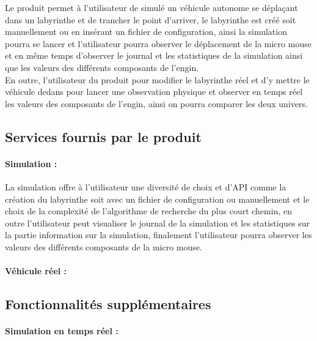 \vspace{5mm}
Le produit permet à l'utilisateur de simulé un véhicule autonome se 
déplaçant dans un labyrinthe et de trancher le point d'arriver, le 
labyrinthe est créé soit manuellement ou en insérant un fichier de 
configuration, ainsi la simulation pourra se lancer et l'utilisateur 
pourra observer le déplacement de la micro mouse et en même temps d'observer 
le journal et les statistiques de la simulation ainsi que les valeurs des différents 
composants de l'engin. \\

En outre, l'utilisateur du produit pour modifier le labyrinthe réel et d'y mettre le 
véhicule dedans pour lancer une observation physique et observer en temps réel les valeurs 
des composants de l'engin, ainsi on pourra comparer les deux univers.

\subsection{Services fournis par le produit} \label{subsec:serLogiciel}

\paragraph{Simulation :}La simulation offre à l'utilisateur une diversité de choix et d'API comme 
la création du labyrinthe soit avec un fichier de configuration ou manuellement 
et le choix de la complexité de l'algorithme de recherche du plus court chemin, 
en outre l'utilisateur peut visualiser le journal de la simulation et les statistiques 
sur la partie information sur la simulation, finalement l'utilisateur pourra observer 
les valeurs des différents composants de la micro mouse. \\



\paragraph{Véhicule réel :}

\subsection{Fonctionnalités supplémentaires} \label{subsec:foncSupplementaires}

\paragraph{Simulation en temps réel :}

